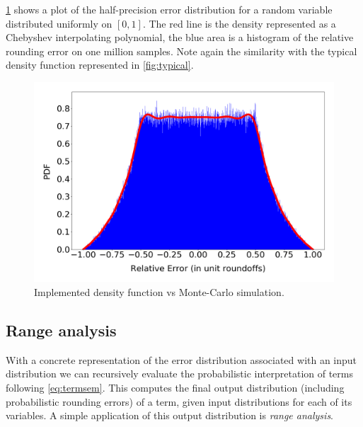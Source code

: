 \documentclass[10pt,conference]{IEEEtran}
\begin{document}
\cref{fig:impl:errdist} shows a plot of the half-precision error distribution for a random variable distributed uniformly on $\left[0,1\right]$. The red line is the density represented as a Chebyshev interpolating polynomial, the blue area is a histogram of the relative rounding error on one million samples. Note again the similarity with the typical density function represented in \cref{fig:typical}.

\begin{figure}[h!]
\includegraphics[scale=0.22]{pics/Relative_Error_Distribution}
\caption{Implemented density function vs Monte-Carlo simulation.}
\label{fig:impl:errdist}
\end{figure}

\subsection{Range analysis}
With a concrete representation of the error distribution associated with an input distribution we can recursively evaluate the probabilistic interpretation of terms following \eqref{eq:termsem}. This computes the final output distribution (including probabilistic rounding errors) of a term, given input distributions for each of its variables. A simple application of this output distribution is \emph{range analysis}. 
\end{document}
